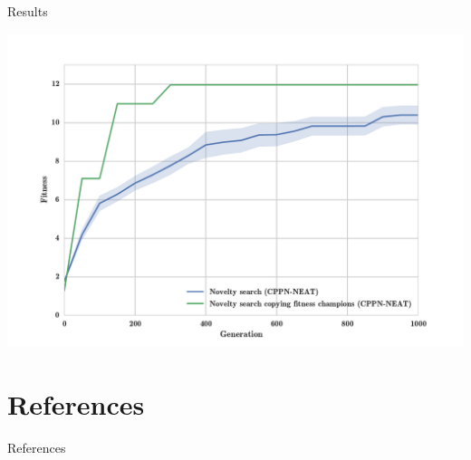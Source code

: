 \documentclass{beamer}
\begin{document}
\begin{frame}[allowframebreaks]{Results}
\begin{minipage}{\textwidth}
\begin{block}{}
\includegraphics[width=1.0\textwidth]{figures/results/CopyFitChampions10.pdf}
\end{block}
\end{minipage}
\end{frame}

\section{References}

\begin{frame}[allowframebreaks]{References}


\end{frame}
\end{document}
